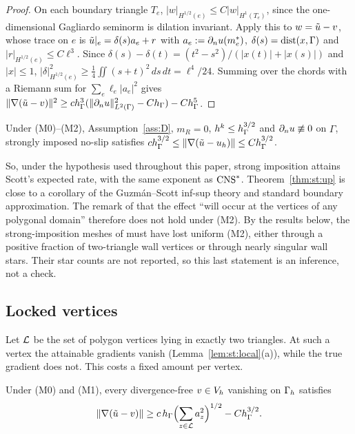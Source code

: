 \begin{proof}
On each boundary triangle $T_e$, $|w|_{H^{1/2}(e)}\le C|w|_{H^1(T_e)}$, since the one-dimensional Gagliardo seminorm is dilation invariant. Apply this to $w=\tilde u-v$, whose trace on $e$ is $\tilde u|_e=\delta(s)a_e+r$ with $a_e:=\partial_n u(m_e^\ast)$, $\delta(s)=\operatorname{dist}(x,\Gamma)$ and $|r|_{H^{1/2}(e)}\le C\ell^3$. Since $\delta(s)-\delta(t)=(t^2-s^2)/(|x(t)|+|x(s)|)$ and $|x|\le1$, $|\delta|^2_{H^{1/2}(e)}\ge\frac14\iint(s+t)^2\,ds\,dt=\ell^4/24$. Summing over the chords with a Riemann sum for $\sum_e\ell_e|a_e|^2$ gives $\lVert \nabla(\tilde u-v)\rVert^2\ge ch_\Gamma^3(\lVert \partial_n u\rVert^2_{L^2(\Gamma)}-Ch_\Gamma)-Ch_\Gamma^5$.
\end{proof}

\begin{theorem}\label{thm:st:two}
Under (M0)--(M2), Assumption~\ref{ass:D}, $m_R=0$, $h^k\le h_\Gamma^{3/2}$ and $\partial_n u\not\equiv0$ on $\Gamma$, strongly imposed no-slip satisfies $ch_\Gamma^{3/2}\le\lVert \nabla(\tilde u-u_h)\rVert\le Ch_\Gamma^{3/2}$.
\end{theorem}

So, under the hypothesis used throughout this paper, strong imposition attains Scott's expected rate, with the same exponent as $\mathrm{CNS}^\ast$. Theorem~\ref{thm:st:up} is close to a corollary of the Guzm\'an--Scott inf-sup theory and standard boundary approximation. The remark of \cite{GjerdeScott2024} that the effect ``will occur at the vertices of any polygonal domain'' therefore does not hold under (M2). By the results below, the strong-imposition meshes of \cite{GjerdeScott2024} must have lost uniform (M2), either through a positive fraction of two-triangle wall vertices or through nearly singular wall stars. Their star counts are not reported, so this last statement is an inference, not a check.

\subsection{Locked vertices}
Let $\mathcal L$ be the set of polygon vertices lying in exactly two triangles. At such a vertex the attainable gradients vanish (Lemma~\ref{lem:st:local}(a)), while the true gradient does not. This costs a fixed amount per vertex.

\begin{theorem}\label{thm:st:count}
Under (M0) and (M1), every divergence-free $v\in V_h$ vanishing on $\Gamma_h$ satisfies
\[
\lVert \nabla(\tilde u-v)\rVert\ge c\,h_\Gamma\Bigl(\sum_{z\in\mathcal L}a_z^2\Bigr)^{1/2}-Ch_\Gamma^{3/2}.
\]
\end{theorem}

